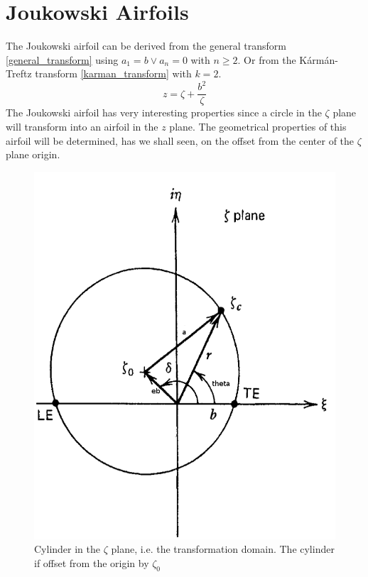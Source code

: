 \section{Joukowski Airfoils}
The Joukowski airfoil can be derived from the general transform \eqref{general_transform} using $a_1 = b \vee a_n = 0$ with  $n \geq 2$. Or from the
K\'arm\'an-Treftz transform \eqref{karman_transform} with $k=2$.
\begin{equation}
    \label{joukowski_transform}
    z = \zeta + \frac{b^2}{\zeta} 
\end{equation}
The Joukowski airfoil has very interesting properties since a circle in the $\zeta$ plane will transform into an airfoil in the $z$ plane.
The geometrical properties of this airfoil will be determined, has we shall seen, on the offset from the center of the $\zeta$ plane origin.
\begin{figure}[!h]
    \centering
    \includegraphics[scale=0.2]{./img/joukowski_cylinder.png}
    \caption{Cylinder in the $\zeta$ plane, i.e. the transformation domain. The cylinder if offset from the origin by $\zeta_0$}
    \label{joukowski_cylinder}
\end{figure}

